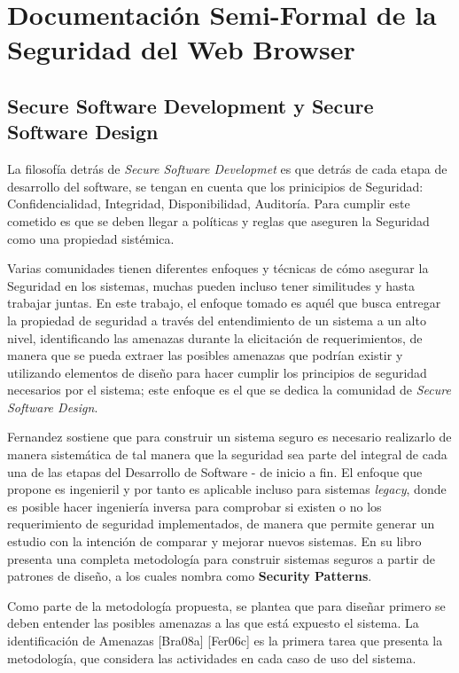 \chapter{Documentación Semi-Formal de la Seguridad del Web Browser}
\label{chap:chap4}

\section{Secure Software Development y Secure Software Design}
\label{chap:chap4.1}

La filosofía detrás de \textit{Secure Software Developmet} es que detrás de cada etapa de desarrollo del software, se tengan en cuenta que los prinicipios de Seguridad: Confidencialidad, Integridad, Disponibilidad, Auditoría. Para cumplir este cometido es que se deben llegar a políticas y reglas que aseguren la Seguridad como una propiedad sistémica.

Varias comunidades tienen diferentes enfoques y técnicas de cómo asegurar la Seguridad en los sistemas, muchas pueden incluso tener similitudes y hasta trabajar juntas. En este trabajo, el enfoque tomado es aquél que busca entregar la propiedad de seguridad a través del entendimiento de un sistema a un alto nivel, identificando las amenazas durante la elicitación de requerimientos, de manera que se pueda extraer las posibles amenazas que podrían existir y utilizando elementos de diseño para hacer cumplir los principios de seguridad necesarios por el sistema; este enfoque es el que se dedica la comunidad de \textit{Secure Software Design}. 


Fernandez \cite{fernandez2013security} sostiene que para construir un sistema seguro es necesario realizarlo de manera sistemática de tal manera que la seguridad sea parte del integral de cada una de las etapas del Desarrollo de Software - de inicio a fin. El enfoque que propone es ingenieril y por tanto es aplicable incluso para sistemas \textit{legacy}, donde es posible hacer ingeniería inversa para comprobar si existen o no los requerimiento de seguridad implementados, de manera que permite generar un estudio con la intención de comparar y mejorar nuevos sistemas. En su libro \cite{ref1} presenta una completa metodología para construir sistemas seguros a partir de patrones de diseño, a los cuales nombra como \textbf{Security Patterns}.

Como parte de la metodología propuesta, se plantea que para diseñar primero se deben entender las posibles amenazas a las que está expuesto el sistema. La identificación de Amenazas [Bra08a] [Fer06c] es la primera tarea que presenta la metodología, que considera las actividades en cada caso de uso del sistema.


